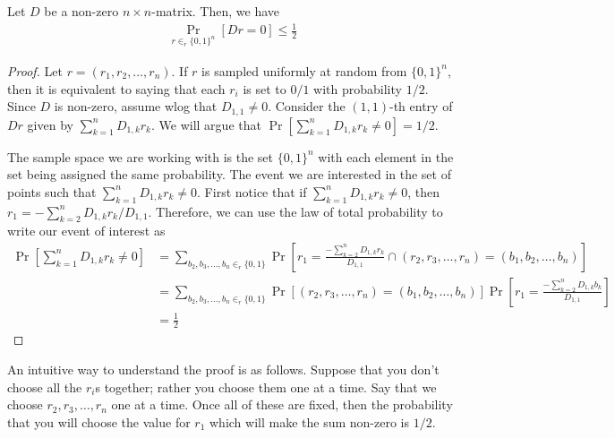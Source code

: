 \begin{lemma}
	Let $D$ be a non-zero $n\times n$-matrix. Then, we have
	\begin{align*}
		\Pr_{r \in_r \{0,1\}^n} [Dr = 0] \leq \frac{1}{2}
	\end{align*}
	\label{lem:matr-ver}
\end{lemma}
\begin{proof}
	Let $r=(r_1, r_2, \ldots, r_n)$. If $r$ is sampled uniformly at random from $\{0,1\}^n$, then it is equivalent to saying that each $r_i$ is set to $0/1$ with probability $1/2$. Since $D$ is non-zero, assume wlog that $D_{1,1} \neq 0$. Consider the $(1,1)$-th entry of $Dr$ given by $\sum_{k=1}^n D_{1,k} r_k$. We will argue that $\Pr[\sum_{k=1}^n D_{1,k} r_k \neq 0] = 1/2$. 
	
	The sample space we are working with is the set $\{0,1\}^n$ with each element in the set being assigned the same probability. The event we are interested in the set of points such that $\sum_{k=1}^n D_{1,k}r_k \neq 0$. First notice that if $\sum_{k=1}^n D_{1,k}r_k \neq 0$, then $r_1 = -\sum_{k=2}^n D_{1,k}r_k/D_{1,1}$. Therefore, we can use the law of total probability to write our event of interest as 
	\begin{align*}
		\Pr[\sum_{k=1}^n D_{1,k} r_k \neq 0] &= \sum_{b_2, b_3, \ldots, b_n \in_r \{0,1\}} \Pr\left[ r_1 = \frac{-\sum_{k=2}^n D_{1,k}r_k}{D_{1,1}} \cap (r_2, r_3, \ldots, r_n) = (b_1, b_2, \ldots, b_n) \right]\\
		&= \sum_{b_2, b_3, \ldots, b_n \in_r \{0,1\}} \Pr\left[ (r_2, r_3, \ldots, r_n) = (b_1, b_2, \ldots, b_n) \right] \Pr\left[ r_1 = \frac{-\sum_{k=2}^n D_{1,k}b_k}{D_{1,1}} \right]\\
		&= \frac{1}{2}
	\end{align*}
\end{proof}

An intuitive way to understand the proof is as follows. Suppose that you don't choose all the $r_i$s together; rather you choose them one at a time. Say that we choose $r_2, r_3, \ldots, r_n$ one at a time.
Once all of these are fixed, then the probability that you will choose the value for $r_1$ which will make the sum non-zero is $1/2$.

